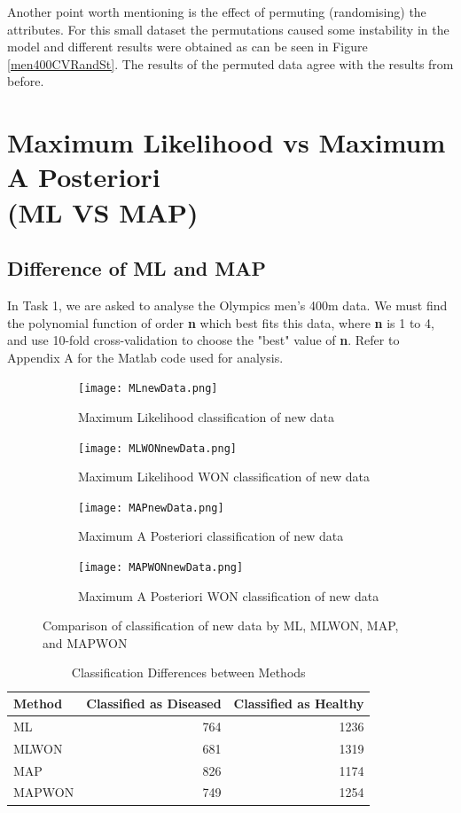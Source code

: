 {{	Another point worth mentioning is the effect of permuting (randomising) the attributes. For this small dataset the permutations caused some instability in the model and different results were obtained as can be seen in Figure \ref{men400CVRandSt}. The results of the permuted data agree with the results from before.
	
\newpage	
\section{Maximum Likelihood vs Maximum A Posteriori  \\ (ML VS MAP)}{\label{s1}
	
	\subsection{Difference of ML and MAP}\label{Int}
	In Task 1, we are asked to analyse the Olympics men's 400m data. We must find the polynomial function of order \textbf{n} which best fits this data, where \textbf{n} is 1 to 4, and use 10-fold cross-validation to choose the "best" value of \textbf{n}. Refer to Appendix A for the Matlab code used for analysis.
	
	\begin{figure}[h!] 
		\centering
		\begin{subfigure}[b]{.49\textwidth}
			\texttt{[image: MLnewData.png]}
			\caption{Maximum Likelihood classification of new data}
			\label{fig:model0}
		\end{subfigure}
		\begin{subfigure}[b]{.49\textwidth}
			\texttt{[image: MLWONnewData.png]}
			\caption{Maximum Likelihood WON classification of new data}
			\label{fig:model1}
		\end{subfigure}
		\begin{subfigure}[b]{.49\textwidth}
			\texttt{[image: MAPnewData.png]}
			\caption{Maximum A Posteriori classification of new data}
			\label{fig:model2}
		\end{subfigure}
		\begin{subfigure}[b]{.49\textwidth}
			\texttt{[image: MAPWONnewData.png]}
			\caption{Maximum A Posteriori WON classification of new data}
			\label{fig:model3}
		\end{subfigure}
		\caption{Comparison of classification of new data by ML, MLWON, MAP, and MAPWON}
		\label{fig:overallC}
	\end{figure}

\begin{table}[h]
	\centering
	\caption{Classification Differences between Methods}
	\label{t:classNumber}
	\begin{tabular}{lrr}
		\hline
		\textbf{Method} & \textbf{Classified as Diseased} & \textbf{Classified as Healthy}\\ \hline
		ML & 764 & 1236 \\
		MLWON& 681 & 1319 \\
		MAP & 826 & 1174  \\
		MAPWON & 749 & 1254 \\
	\end{tabular}
\end{table}
	
}}}
